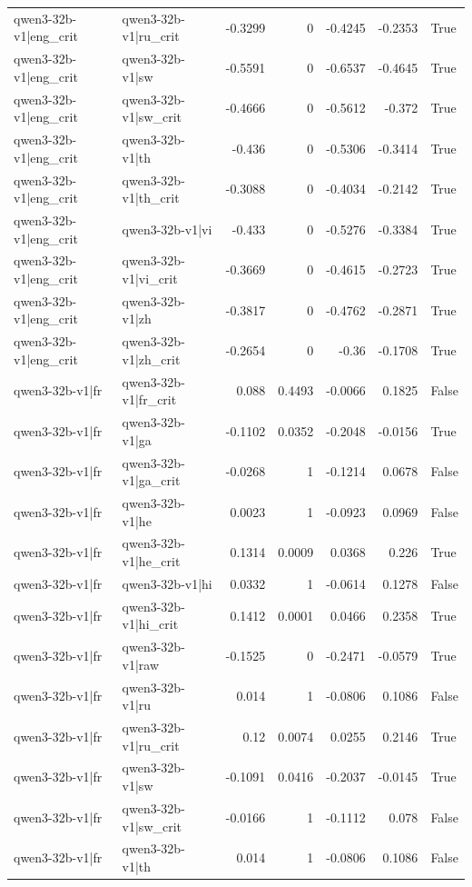 \begin{table}
\begin{tabular}{l l r r r r l}
qwen3-32b-v1|eng_crit & qwen3-32b-v1|ru_crit & -0.3299 & 0 & -0.4245 & -0.2353 & True \\
qwen3-32b-v1|eng_crit & qwen3-32b-v1|sw & -0.5591 & 0 & -0.6537 & -0.4645 & True \\
qwen3-32b-v1|eng_crit & qwen3-32b-v1|sw_crit & -0.4666 & 0 & -0.5612 & -0.372 & True \\
qwen3-32b-v1|eng_crit & qwen3-32b-v1|th & -0.436 & 0 & -0.5306 & -0.3414 & True \\
qwen3-32b-v1|eng_crit & qwen3-32b-v1|th_crit & -0.3088 & 0 & -0.4034 & -0.2142 & True \\
qwen3-32b-v1|eng_crit & qwen3-32b-v1|vi & -0.433 & 0 & -0.5276 & -0.3384 & True \\
qwen3-32b-v1|eng_crit & qwen3-32b-v1|vi_crit & -0.3669 & 0 & -0.4615 & -0.2723 & True \\
qwen3-32b-v1|eng_crit & qwen3-32b-v1|zh & -0.3817 & 0 & -0.4762 & -0.2871 & True \\
qwen3-32b-v1|eng_crit & qwen3-32b-v1|zh_crit & -0.2654 & 0 & -0.36 & -0.1708 & True \\
qwen3-32b-v1|fr & qwen3-32b-v1|fr_crit & 0.088 & 0.4493 & -0.0066 & 0.1825 & False \\
qwen3-32b-v1|fr & qwen3-32b-v1|ga & -0.1102 & 0.0352 & -0.2048 & -0.0156 & True \\
qwen3-32b-v1|fr & qwen3-32b-v1|ga_crit & -0.0268 & 1 & -0.1214 & 0.0678 & False \\
qwen3-32b-v1|fr & qwen3-32b-v1|he & 0.0023 & 1 & -0.0923 & 0.0969 & False \\
qwen3-32b-v1|fr & qwen3-32b-v1|he_crit & 0.1314 & 0.0009 & 0.0368 & 0.226 & True \\
qwen3-32b-v1|fr & qwen3-32b-v1|hi & 0.0332 & 1 & -0.0614 & 0.1278 & False \\
qwen3-32b-v1|fr & qwen3-32b-v1|hi_crit & 0.1412 & 0.0001 & 0.0466 & 0.2358 & True \\
qwen3-32b-v1|fr & qwen3-32b-v1|raw & -0.1525 & 0 & -0.2471 & -0.0579 & True \\
qwen3-32b-v1|fr & qwen3-32b-v1|ru & 0.014 & 1 & -0.0806 & 0.1086 & False \\
qwen3-32b-v1|fr & qwen3-32b-v1|ru_crit & 0.12 & 0.0074 & 0.0255 & 0.2146 & True \\
qwen3-32b-v1|fr & qwen3-32b-v1|sw & -0.1091 & 0.0416 & -0.2037 & -0.0145 & True \\
qwen3-32b-v1|fr & qwen3-32b-v1|sw_crit & -0.0166 & 1 & -0.1112 & 0.078 & False \\
qwen3-32b-v1|fr & qwen3-32b-v1|th & 0.014 & 1 & -0.0806 & 0.1086 & False \\

\end{tabular}
\end{table}
